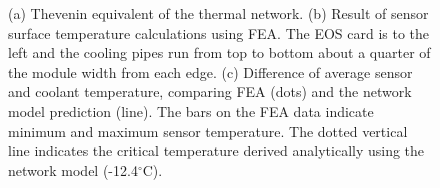 \begin{figure}[ht]
\centering
{}\quad
{}\quad\quad
{}
\caption{(a) Thevenin equivalent of the thermal network. (b) Result of sensor surface temperature calculations using FEA. The EOS card is to the left and the cooling pipes run from top to bottom about a quarter of the module width from each edge. (c) Difference of average sensor and coolant temperature, comparing FEA (dots) and the network model prediction (line). The bars on the FEA data indicate minimum and maximum sensor temperature. The dotted vertical line indicates the critical temperature derived analytically using the network model (-12.4$^\circ$C).}
\label{fig:verification}
\end{figure}
